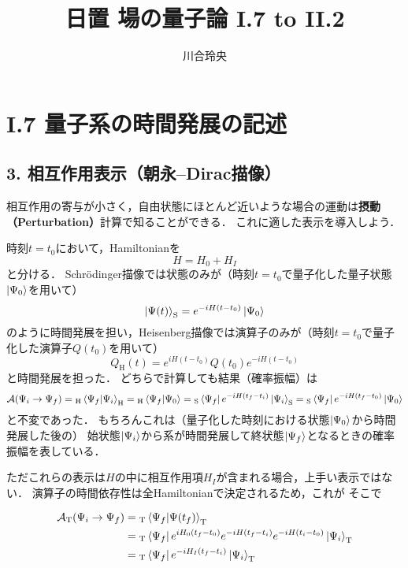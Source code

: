 \documentclass[uplatex]{jsarticle}
\numberwithin{theorem}{section}
\begin{document}
\title{日置 場の量子論 I.7 to II.2}
\author{川合玲央}

\maketitle

\section*{I.7 量子系の時間発展の記述}

\subsection*{3. 相互作用表示（朝永--Dirac描像）}
相互作用の寄与が小さく，自由状態にほとんど近いような場合の運動は\textbf{摂動（Perturbation）}計算で知ることができる．
これに適した表示を導入しよう．

時刻$t = t_0$において，Hamiltonianを
\begin{equation}
    H = H_0 + H_I
\end{equation}
と分ける．
Schr\"{o}dinger描像では状態のみが（時刻$t = t_0$で量子化した量子状態$\ket{\Psi_0}$を用いて）
\begin{equation}
    \ket{\Psi(t)}_\text{S} = e^{-i H (t - t_0)} \ket{\Psi_0}
\end{equation}
のように時間発展を担い，Heisenberg描像では演算子のみが（時刻$t = t_0$で量子化した演算子$Q(t_0)$を用いて）
\begin{equation}
    Q_\text{H}(t) = e^{i H (t - t_0)} Q(t_0) e^{-i H (t - t_0)}
\end{equation}
と時間発展を担った．
どちらで計算しても結果（確率振幅）は
\begin{equation}
    \mathcal{A}(\Psi_i \to \Psi_f)
    = {}_\text{H}\bra{\Psi_f} \ket{\Psi_i}_\text{H}
    = {}_\text{H}\bra{\Psi_f} \ket{\Psi_0}
    = {}_\text{S}\bra{\Psi_f} e^{-i H (t_f - t_i)} \ket{\Psi_i}_\text{S}
    = {}_\text{S}\bra{\Psi_f} e^{-i H (t_f - t_0)} \ket{\Psi_0}
\end{equation}
と不変であった．
もちろんこれは（量子化した時刻における状態$\ket{\Psi_0}$から時間発展した後の）
始状態$\ket{\Psi_i}$から系が時間発展して終状態$\ket{\Psi_f}$となるときの確率振幅を表している．

ただこれらの表示は$H$の中に相互作用項$H_I$が含まれる場合，上手い表示ではない．
演算子の時間依存性は全Hamiltonianで決定されるため，これが
そこで


\begin{equation}
    \begin{split}
        \mathcal{A}_\text{T} (\Psi_i \to \Psi_f)
        &= {}_\text{T}\bra{\Psi_f}\ket{\Psi(t_f)}_\text{T} \\
        &= {}_\text{T}\bra{\Psi_f} e^{i H_0 (t_f - t_0)} e^{-i H (t_f - t_i)} e^{-i H (t_i - t_0)} \ket{\Psi_i}_\text{T} \\
        &= {}_\text{T}\bra{\Psi_f} e^{-i H_I (t_f - t_i)} \ket{\Psi_i}_\text{T}
    \end{split}
\end{equation}
\end{document}
